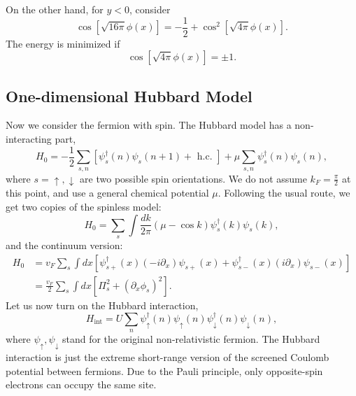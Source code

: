 \documentclass[aps,prb,superscriptaddress,nofootinbib]{revtex4}
\begin{document}
On the other hand, for $y<0$, consider
\begin{equation}
	\cos\left[\sqrt{16\pi}\phi(x)\right] = -\frac{1}{2} + \cos^2\left[\sqrt{4\pi}\phi(x)\right].
\end{equation}
The energy is minimized if 
\begin{equation}
	\cos\left[\sqrt{4\pi}\phi(x)\right] = \pm 1.
\end{equation}




\subsection{One-dimensional Hubbard Model}
Now we consider the fermion with spin.
The Hubbard model has a non-interacting part,
\begin{equation}
	H_{0}=-\frac{1}{2} \sum_{s, n}\left[\psi_{s}^{\dagger}(n) \psi_{s}(n+1)+\text { h.c. }\right]+\mu \sum_{s, n} \psi_{s}^{\dagger}(n) \psi_{s}(n),
\end{equation}
where $s=\uparrow, \downarrow$ are two possible spin orientations. We do not assume $k_F = \frac{\pi}{2}$ at this point, and use a general chemical potential $\mu$.
Following the usual route, we get two copies of the spinless model:
\begin{equation}
	H_{0}=\sum_{s} \int \frac{d k}{2 \pi} (\mu-\cos k) \psi_{s}^{\dagger}(k) \psi_{s}(k),
\end{equation}
and the continuum version:
\begin{equation}
\begin{aligned}
	H_0 &= v_F \sum_{s} \int d x \left[
		\psi_{s+}^{\dagger}(x)\left(-i \partial_{x}\right) \psi_{s+}(x) +
		\psi_{s-}^{\dagger}(x)\left( i \partial_{x}\right) \psi_{s-}(x)
	\right] \\
	&= \frac{v_F}{2} \sum_s \int d x \left[\Pi_{s}^{2}+\left(\partial_x \phi_{s}\right)^{2}\right].
\end{aligned}
\end{equation}
Let us now turn on the Hubbard interaction,
\begin{equation}
	H_{\mathrm{int}}=U \sum_{n} \psi_{\uparrow}^{\dagger}(n) \psi_{\uparrow}(n) \psi_{\downarrow}^{\dagger}(n) \psi_{\downarrow}(n),
\end{equation}
where $\psi_{\uparrow}, \psi_{\downarrow}$ stand for the original non-relativistic fermion. 
The Hubbard interaction is just the extreme short-range version of the screened Coulomb potential between fermions. 
Due to the Pauli principle, only opposite-spin electrons can occupy the same site.
\end{document}
